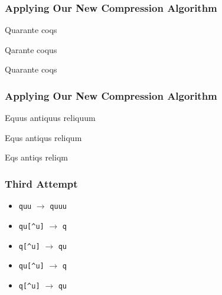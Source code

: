 \documentclass{../ucll-slides}
\begin{document}
\begin{frame}
  \frametitle{Applying Our New Compression Algorithm}
  \begin{center}
    Quarante coqs
  \end{center}
  \vskip5mm
  \begin{center}
    Qarante coqus
  \end{center}
  \vskip5mm
  \begin{center}
    Quarante coqs
  \end{center}
  \begin{center}
  \end{center}
\end{frame}

\begin{frame}
  \frametitle{Applying Our New Compression Algorithm}
  \begin{center}
    Equus antiquus reliquum
  \end{center}
  \vskip5mm
  \begin{center}
    Equs antiqus reliqum
  \end{center}
  \vskip5mm
  \begin{center}
    Eqs antiqs reliqm
  \end{center}
  \begin{center}
  \end{center}
\end{frame}

\begin{frame}
  \frametitle{Third Attempt}
  \begin{itemize}
    \item {\tt quu} $\rightarrow$ {\tt quuu}
    \item {\tt qu[\^{}u]} $\rightarrow$ {\tt q}
    \item {\tt q[\^{}u]} $\rightarrow$ {\tt qu}
  \end{itemize}
  \vskip5mm
  \begin{itemize}
    \item {\tt qu[\^{}u]} $\rightarrow$ {\tt q}
    \item {\tt q[\^{}u]} $\rightarrow$ {\tt qu}
  \end{itemize}
\end{frame}
\end{document}
